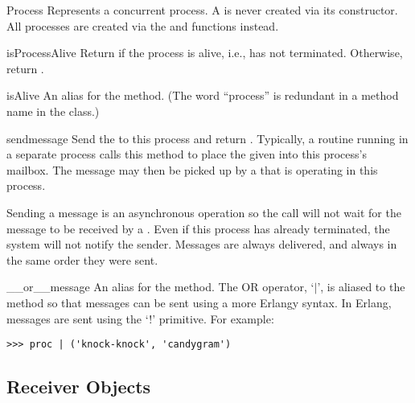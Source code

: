 \documentclass{howto}
\newcommand{\pipe}[0]{\begin{math}|\end{math}}
\newcommand{\pipe}[0]{|}
\begin{document}
\begin{classdesc}{Process}{}
Represents a concurrent process. A  is never created via its
constructor. All processes are created via the  and
 functions instead.

\begin{methoddesc}{isProcessAlive}{}
Return  if the process is alive, i.e., has not terminated.
Otherwise, return .
\end{methoddesc}

\begin{methoddesc}{isAlive}{}
An alias for the  method. (The word ``process'' is
redundant in a method name in the  class.)
\end{methoddesc}

\begin{methoddesc}{send}{message}
Send the  to this process and return . Typically, a
routine running in a separate process calls this method to place the given
 into this process's mailbox. The message may then be picked up
by a  that is operating in this process.

Sending a message is an asynchronous operation so the  call will
not wait for the message to be received by a . Even if this
process has already terminated, the system will not notify the sender. Messages
are always delivered, and always in the same order they were sent.
\end{methoddesc}

\begin{methoddesc}{__or__}{message}
\opindex{|}
An alias for the  method. The OR operator, `\pipe', is aliased to
the  method so that messages can be sent using a more Erlangy
syntax. In Erlang, messages are sent using the `!' primitive. For example:
\begin{verbatim}
>>> proc | ('knock-knock', 'candygram')
\end{verbatim}
\end{methoddesc}

\end{classdesc}



\subsection{Receiver Objects}
\label{Receiver}
\end{document}
